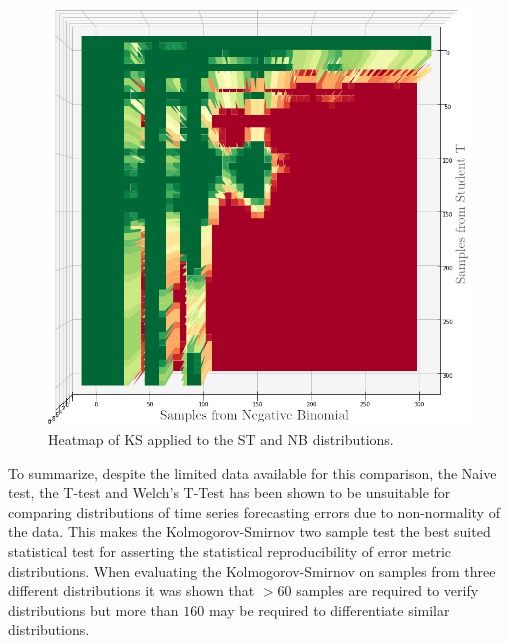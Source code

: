 \begin{figure}[h]
  \centering
  \includegraphics[width=\linewidth]{./img/hypothesis_test/deepar_heatmap_Y_student_t_X_neg_bin_ks_edited.png}
  \caption{Heatmap of KS applied to the ST and NB distributions.}
  \label{ks_student_t_neg_bin}
  \endminipage
\end{figure}

To summarize, despite the limited data available for this comparison, the Naive test, the T-test and Welch’s T-Test has been shown to be unsuitable for comparing distributions of time series forecasting errors due to non-normality of the data. This makes the Kolmogorov-Smirnov two sample test the best suited statistical test for asserting the statistical reproducibility of error metric distributions. When evaluating the Kolmogorov-Smirnov on samples from three different distributions it was shown that \(>60\) samples are required to verify distributions but more than \(160\) may be required to differentiate similar distributions.

